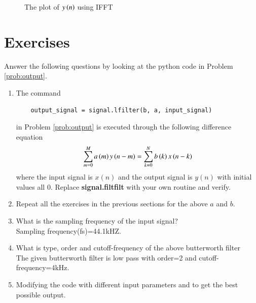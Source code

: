 \documentclass[journal,12pt,twocolumn]{IEEEtran}
\renewcommand\thesection{\arabic{section}}
\begin{document}
\begin{enumerate}[label=\thesection.\arabic*]
\begin{figure}[!ht]
         \centering
         \caption{The plot of $y\left(n\right)$ using IFFT}
         \label{yn_ifft}
       \end{figure}
       
    \end{enumerate}
\section{Exercises}

Answer the following questions by looking at the python code in Problem \ref{prob:output}.
\begin{enumerate}[label=\thesection.\arabic*]
\item
The command
\begin{lstlisting}
	output_signal = signal.lfilter(b, a, input_signal)
	\end{lstlisting}
in Problem \ref{prob:output} is executed through the following difference equation
\begin{equation}
\label{eq:iir_filter_gen}
 \sum _{m=0}^{M}a\left(m\right)y\left(n-m\right)=\sum _{k=0}^{N}b\left(k\right)x\left(n-k\right)
\end{equation}
%
where the input signal is $x(n)$ and the output signal is $y(n)$ with initial values all 0. Replace
\textbf{signal.filtfilt} with your own routine and verify.
%
\item Repeat all the exercises in the previous sections for the above $a$ and $b$.

\item What is the sampling frequency of the input signal?
\\
\solution
Sampling frequency(fs)=44.1kHZ.
\item
What is type, order and  cutoff-frequency of the above butterworth filter
\\
\solution
The given butterworth filter is low pass with order=2 and cutoff-frequency=4kHz.
%
\item
Modifying the code with different input parameters and to get the best possible output.
%
\end{enumerate}
\end{document}
